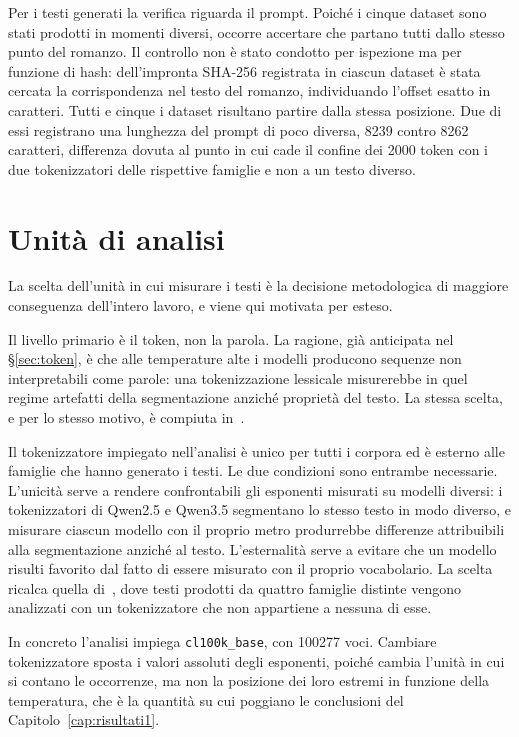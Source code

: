 Per i testi generati la verifica riguarda il prompt. Poiché i cinque dataset sono
stati prodotti in momenti diversi, occorre accertare che partano tutti dallo
stesso punto del romanzo. Il controllo non è stato condotto per ispezione ma per
funzione di hash: dell'impronta SHA-256 registrata in ciascun dataset è stata
cercata la corrispondenza nel testo del romanzo, individuando l'offset esatto in
caratteri. Tutti e cinque i dataset risultano partire dalla stessa posizione. Due
di essi registrano una lunghezza del prompt di poco diversa, \num{8239} contro
\num{8262} caratteri, differenza dovuta al punto in cui cade il confine dei 2000
token con i due tokenizzatori delle rispettive famiglie e non a un testo diverso.

\section{Unità di analisi}
\label{sec:unita}

La scelta dell'unità in cui misurare i testi è la decisione metodologica di
maggiore conseguenza dell'intero lavoro, e viene qui motivata per esteso.

Il livello primario è il token, non la parola. La ragione, già anticipata nel
§\ref{sec:token}, è che alle temperature alte i modelli producono sequenze non
interpretabili come parole: una tokenizzazione lessicale misurerebbe in quel
regime artefatti della segmentazione anziché proprietà del testo. La stessa
scelta, e per lo stesso motivo, è compiuta in~\cite{mikhaylovskiy2025zipf}.

Il tokenizzatore impiegato nell'analisi è unico per tutti i corpora ed è esterno
alle famiglie che hanno generato i testi. Le due condizioni sono entrambe
necessarie. L'unicità serve a rendere confrontabili gli esponenti misurati su
modelli diversi: i tokenizzatori di Qwen2.5 e Qwen3.5 segmentano lo stesso testo
in modo diverso, e misurare ciascun modello con il proprio metro produrrebbe
differenze attribuibili alla segmentazione anziché al testo. L'esternalità serve
a evitare che un modello risulti favorito dal fatto di essere misurato con il
proprio vocabolario. La scelta ricalca quella di~\cite{mikhaylovskiy2025zipf},
dove testi prodotti da quattro famiglie distinte vengono analizzati con un
tokenizzatore che non appartiene a nessuna di esse.

In concreto l'analisi impiega \texttt{cl100k\_base}, con \num{100277} voci.
Cambiare tokenizzatore sposta i valori assoluti degli esponenti, poiché cambia
l'unità in cui si contano le occorrenze, ma non la posizione dei loro estremi in
funzione della temperatura, che è la quantità su cui poggiano le conclusioni del
Capitolo~\ref{cap:risultati1}.

